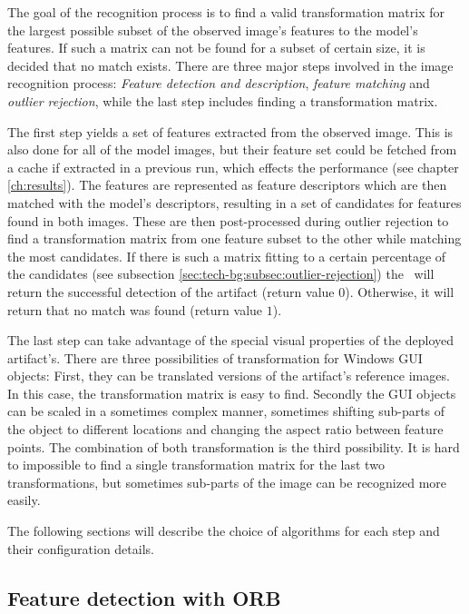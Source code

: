 The goal of the recognition process is to find a valid transformation matrix for the largest possible subset of the observed image's features to the model's features. If such a matrix can not be found for a subset of certain size, it is decided that no match exists. There are three major steps involved in the image recognition process: \emph{Feature detection and description}, \emph{feature matching} and \emph{outlier rejection}, while the last step includes finding a transformation matrix.

The first step yields a set of features extracted from the observed image. This is also done for all of the model images, but their feature set could be fetched from a cache if extracted in a previous run, which effects the performance (see chapter \ref{ch:results}). The features are represented as feature descriptors which are then matched with the model's descriptors, resulting in a set of candidates for features found in both images. These are then post-processed during outlier rejection to find a transformation matrix from one feature subset to the other while matching the most candidates. If there is such a matrix fitting to a certain percentage of the candidates (see subsection \ref{sec:tech-bg:subsec:outlier-rejection}) the \vd~will return the successful detection of the artifact (return value $0$). Otherwise, it will return that no match was found (return value $1$).

The last step can take advantage of the special visual properties of the deployed artifact's. There are three possibilities of transformation for Windows GUI objects: First, they can be translated versions of the artifact's reference images. In this case, the transformation matrix is easy to find. Secondly the GUI objects can be scaled in a sometimes complex manner, sometimes shifting sub-parts of the object to different locations and changing the aspect ratio between feature points. The combination of both transformation is the third possibility. It is hard to impossible to find a single transformation matrix for the last two transformations, but sometimes sub-parts of the image can be recognized more easily.

The following sections will describe the choice of algorithms for each step and their configuration details.

\subsection{Feature detection with ORB}\label{sec:tech-bg:subsec:feature-detection}

